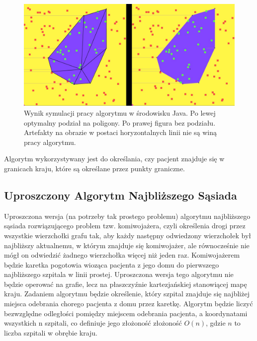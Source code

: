 \documentclass{article}
\newcommand\tab[1][1cm]{\hspace*{#1}}
\begin{document}
\begin{figure}[H]
    \includegraphics[width=15cm]{Subpolygons.png}
    \centering
    \caption {Wynik symulacji pracy algorytmu w środowisku Java. Po lewej optymalny podział na poligony. Po prawej figura bez podziału. Artefakty na obrazie w postaci horyzontalnych linii nie są winą pracy algorytmu.}
\end{figure}
\tab Algorytm wykorzystywany jest do określania, czy pacjent znajduje się w granicach kraju, które są określane przez punkty graniczne.

\subsection{Uproszczony Algorytm Najbliższego Sąsiada}
\tab Uproszczona wersja (na potrzeby tak prostego problemu) algorytmu najbliższego sąsiada rozwiązującego problem tzw. komiwojażera, czyli określenia drogi przez wszystkie wierzchołki grafu tak, aby każdy następny odwiedzony wierzchołek był najbliższy aktualnemu, w którym znajduje się komiwojażer, ale równocześnie nie mógł on odwiedzić żadnego wierzchołka więcej niż jeden raz.
\newline \tab Komiwojażerem będzie karetka pogotowia wioząca pacjenta z jego domu do pierwszego najbliższego szpitala w linii prostej. Uproszczona wersja tego algorytmu nie będzie operować na grafie, lecz na płaszczyźnie kartezjańskiej stanowiącej mapę kraju. Zadaniem algorytmu będzie określenie, który szpital znajduje się najbliżej miejsca odebrania chorego pacjenta z domu przez karetkę.
\newline \tab Algorytm będzie liczyć bezwzględne odległości pomiędzy miejscem odebrania pacjenta, a koordynatami wszystkich n szpitali, co definiuje jego złożoność złożoność $O(n)$, gdzie $n$ to liczba szpitali w obrębie kraju.
\end{document}
